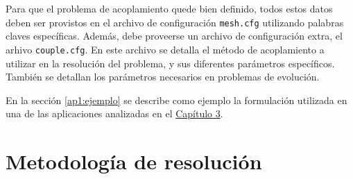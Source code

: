 Para que el problema de acoplamiento quede bien definido,
todos estos datos deben ser provistos en el archivo de configuración \texttt{mesh.cfg} utilizando palabras claves específicas.
Además, debe proveerse un archivo de configuración extra, el arhivo \texttt{couple.cfg}.
En este archivo se detalla el método de acoplamiento a utilizar en la resolución del problema,
y sus diferentes parámetros específicos.
También se detallan los parámetros necesarios en problemas de evolución.

En la sección \ref{ap1:ejemplo} se describe como ejemplo la formulación utilizada en una de las aplicaciones analizadas en el \hyperlink{chapter.3}{Capítulo 3}.

\section{Metodología de resolución}
\label{ap1:resolucion}

